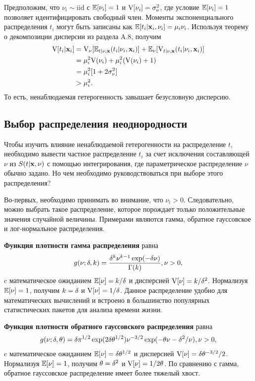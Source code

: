 Предположим, что $\nu_i \sim \mathrm{iid}$ с $\mathbb{E}[\nu_i]=1$ и $\mathrm{V}[\nu_i]=\sigma_{\nu}^{2}$, где условие $\mathbb{E}[\nu_i]=1$ позволяет идентифицировать свободный член. Моменты экспоненциального распределения $t_i$ могут быть записаны как $\mathbb{E}[t_i|\mathbf{x}_i,\nu_i]=\mu_i\nu_i$. Используя теорему о декомпозиции дисперсии из раздела A.8, 
получим
    \begin{align}
    \label{eq:18.3}
    \mathrm{V}[t_i|\mathbf{x}_i]    &=\mathrm{V}_{\nu}[\mathbb{E}_{t|\nu,\mathbf{x}}(t_i|\nu_i,\mathbf{x}_i)] + \mathbb{E}_{\nu}[\mathrm{V}_{t|\nu,\mathbf{x}}(t_i|\nu_i,\mathbf{x}_i)] \\
                    &=\mu_i^{2}\mathrm{V}(\nu_i)+\mu_i^{2}(\mathrm{V}(\nu_i)+1) \notag\\
                    &=\mu_i^{2}[1+2\sigma_{\nu}^{2}] \notag\\
                    &>\mu_i^{2}. \notag
    \end{align}
То есть, ненаблюдаемая гетерогенность завышает безусловную дисперсию.


\subsection{Выбор распределения неоднородности}\label{sec:18.2.2}

\noindent
Чтобы изучить влияние ненаблюдаемой гетерогенности на распределение $t$, необходимо вывести частное распределение $t_i$ за счет исключения составляющей $\nu$ из $S(t|\mathbf{x},\nu)$ с помощью интегрирования, где параметрическое распределение $\nu$ обычно задано. Но чем необходимо руководствоваться при выборе этого распределения?

Во-первых, необходимо принимать во внимание, что $\nu_i>0$. Следовательно, можно выбрать такое распределение, которое порождает только положительные значения случайной величины. Примерами являются гамма, обратное гауссовское и лог-нормальное распределения.

\textbf{Функция плотности гамма распределения} равна
    \begin{align}
        \label{eq:18.4}
        g(\nu;\delta,k) = \frac{\delta^k\nu^{k-1}\exp(-\delta\nu)}{\Gamma(k)}, \nu>0,
    \end{align}
c математическое ожиданием $\mathbb{E}[\nu]=k/\delta$ и дисперсией $\mathrm{V}[\nu]=k/\delta^2$. Нормализуя $\mathbb{E}[\nu]=1$, получим $k=\delta$ и $\mathrm{V}[\nu]=1/\delta$. Данное распределение удобно для математических вычислений и встроено в большинство популярных статистических пакетов для анализа времени жизни.

\textbf{Функция плотности обратного гауссовского распределения} равна
    \begin{align}
        \label{eq:18.5}
        g(\nu;\delta,\theta) = \delta\pi^{1/2}\exp(2\delta\theta^{1/2})\nu^{-3/2}\exp(-\theta\nu-\delta^{2}/\nu), \nu>0,
    \end{align}
c математическое ожиданием $\mathbb{E}[\nu] = \delta\theta^{1/2}$ и дисперсией $\mathrm{V}[\nu]=\delta\theta^{-3/2}/2$. Нормализуя $\mathbb{E}[\nu]=1$, получим $\theta=\delta^2$ и $\mathrm{V}[\nu]=1/2\theta$. По сравнению с гамма, обратное гауссовское распределение имеет более тяжелый хвост.

